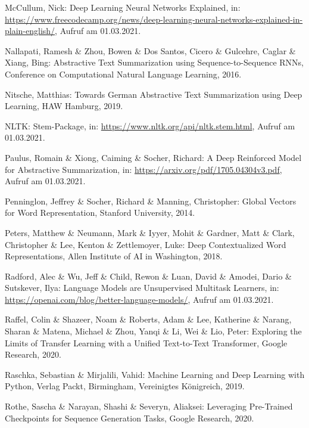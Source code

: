 \begin{thebibliography}{50}
McCullum, Nick: Deep Learning Neural Networks Explained, in: \url{https://www.freecodecamp.org/news/deep-learning-neural-networks-explained-in-plain-english/}, Aufruf am 01.03.2021.

Nallapati, Ramesh \& Zhou, Bowen \& Dos Santos, Cicero \& Gulcehre, Caglar \& Xiang, Bing: Abstractive Text Summarization using Sequence-to-Sequence RNNs, Conference on Computational Natural Language Learning, 2016.

Nitsche, Matthias: Towards German Abstractive Text Summarization using Deep Learning, HAW Hamburg, 2019.

NLTK: Stem-Package, in: \url{https://www.nltk.org/api/nltk.stem.html}, Aufruf am 01.03.2021.

Paulus, Romain \& Xiong, Caiming \& Socher, Richard: A Deep Reinforced Model for Abstractive Summarization, in: \url{https://arxiv.org/pdf/1705.04304v3.pdf}, Aufruf am 01.03.2021.

Penninglon, Jeffrey \& Socher, Richard \& Manning, Christopher: Global Vectors for Word Representation, Stanford University, 2014.

Peters, Matthew \& Neumann, Mark \& Iyyer, Mohit \& Gardner, Matt \& Clark, Christopher \& Lee, Kenton \& Zettlemoyer, Luke: Deep Contextualized Word Representations, Allen Institute of AI in Washington, 2018.

Radford, Alec \& Wu, Jeff \& Child, Rewon \& Luan, David \& Amodei, Dario \& Sutskever, Ilya: Language Models are Unsupervised Multitask Learners, in: \url{https://openai.com/blog/better-language-models/}, Aufruf am 01.03.2021.

Raffel, Colin \& Shazeer, Noam \& Roberts, Adam \& Lee, Katherine \& Narang, Sharan \& Matena, Michael \& Zhou, Yanqi \& Li, Wei \& Lio, Peter: Exploring the Limits of Transfer Learning with a Unified Text-to-Text Transformer, Google Research, 2020.

Raschka, Sebastian \& Mirjalili, Vahid: Machine Learning and Deep Learning with Python, Verlag Packt, Birmingham, Vereinigtes Königreich, 2019.

Rothe, Sascha \& Narayan, Shashi \& Severyn, Aliaksei: Leveraging Pre-Trained Checkpoints for Sequence Generation Tasks, Google Research, 2020.


\end{thebibliography}
